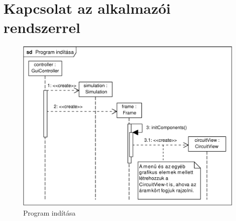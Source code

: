 \section{Kapcsolat az alkalmazói rendszerrel}

\begin{figure}[h]
\begin{center}
\includegraphics[width=17cm]{chapters/chapter11/pdfs/1_program_start.pdf}
\caption{Program indítása}
\label{fig:program_start}
\end{center}
\end{figure}


